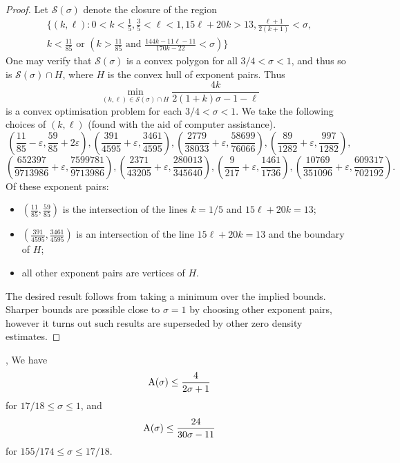 \begin{proof}
Let $\mathcal{S}(\sigma)$ denote the closure of the region
\begin{align*}
\Bigg\{(k, \ell) : 0 < k < \frac{1}{5}, \frac{3}{5} < \ell < 1, 15\ell + 20k > 13, \frac{\ell + 1}{2(k + 1)} < \sigma, \\
k < \frac{11}{85} \text{ or } \left(k > \frac{11}{85} \text{ and } \frac{144k - 11\ell - 11}{170k - 22} < \sigma\right)\Bigg\}
\end{align*}
One may verify that $\mathcal{S}(\sigma)$ is a convex polygon for all $3/4 < \sigma < 1$, and thus so is $\mathcal{S}(\sigma) \cap H$, where $H$ is the convex hull of exponent pairs. Thus
\[
\min_{(k, \ell) \in \mathcal{S}(\sigma) \cap H}\frac{4k}{2(1 + k)\sigma - 1 - \ell}
\]
is a convex optimisation problem for each $3/4 < \sigma < 1$.
We take the following choices of $(k, \ell)$ (found with the aid of computer assistance).
\[
\left(\frac{11}{85} - \varepsilon, \frac{59}{85} + 2\varepsilon\right),
\left(\frac{391}{4595} + \varepsilon, \frac{3461}{4595}\right),
\left(\frac{2779}{38033} + \varepsilon, \frac{58699}{76066}\right),
\left(\frac{89}{1282} + \varepsilon, \frac{997}{1282}\right),
\]
\[
\left(\frac{652397}{9713986} + \varepsilon, \frac{7599781}{9713986}\right),
\left(\frac{2371}{43205} + \varepsilon, \frac{280013}{345640}\right),
\left(\frac{9}{217} + \varepsilon, \frac{1461}{1736}\right), \left(\frac{10769}{351096} + \varepsilon, \frac{609317}{702192}\right).
\]
Of these exponent pairs:
\begin{itemize}
    \item $(\frac{11}{85}, \frac{59}{85})$ is the intersection of the lines $k = 1/5$ and $15\ell + 20k = 13$;
    \item $(\frac{391}{4595}, \frac{3461}{4595})$ is an intersection of the line $15\ell + 20k = 13$ and the boundary of $H$;
    \item all other exponent pairs are vertices of $H$.
\end{itemize}
The desired result follows from taking a minimum over the implied bounds. Sharper bounds are possible close to $\sigma = 1$ by choosing other exponent pairs, however it turns out such results are superseded by other zero density estimates.
\end{proof}


\begin{lemma}\label{ivic-zero-density}\cite{ivic_exponent_pairs}, \cite[Theorem 11.2]{ivic} We have
    $$ \mathrm{A}(\sigma) \leq \frac{4}{2\sigma+1}$$
    for $17/18 \leq \sigma \leq 1$, and
    $$ \mathrm{A}(\sigma) \leq \frac{24}{30\sigma-11}$$
    for $155/174 \leq \sigma \leq 17/18$.
\end{lemma}
\literature
{}

